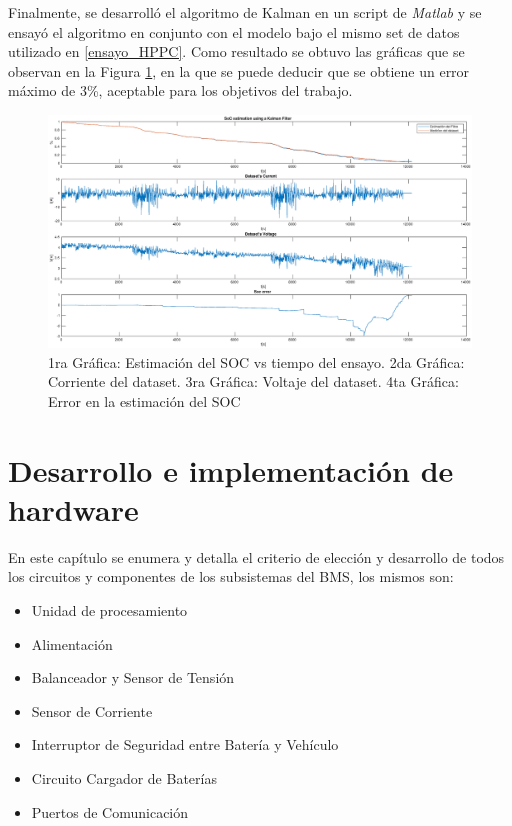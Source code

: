 \documentclass[10pt, a4paper]{report}
\begin{document}
Finalmente, se desarroll\'o el algoritmo de Kalman en un script de \emph{Matlab}
y se ensay\'o el algoritmo en conjunto con el modelo bajo el mismo set de datos
utilizado en \ref{ensayo_HPPC}. Como resultado se obtuvo las gr\'aficas que se
observan en la Figura \ref{kalman_result_matlab}, en la que se puede deducir que
se obtiene un error m\'aximo de 3\%, aceptable para los objetivos del trabajo.

\begin{figure}[h!]
    \begin{center}
        \includegraphics[width=1\textwidth]{kalman_result_matlab.eps}
        \caption{1ra Gr\'afica: Estimaci\'on del \acrshort{SOC} vs
        tiempo del ensayo. 2da Gr\'afica: Corriente del dataset. 3ra
        Gr\'afica: Voltaje del dataset. 4ta Gr\'afica: Error en la estimaci\'on
        del \acrshort{SOC}} 
        \label{kalman_result_matlab}
    \end{center}
\end{figure}

\newpage

\chapter{Desarrollo e implementación de hardware}\label{desarrollo_hw}
\thispagestyle{fancy}

En este capítulo se enumera y detalla el criterio de elección y desarrollo de 
todos los circuitos y componentes de los subsistemas del BMS, los mismos son:

\begin{itemize}
	\item Unidad de procesamiento
	\item Alimentación
	\item Balanceador y Sensor de Tensión
	\item Sensor de Corriente
	\item Interruptor de Seguridad entre Batería y Vehículo
	\item Circuito Cargador de Baterías
	\item Puertos de Comunicación
\end{itemize}
\end{document}
